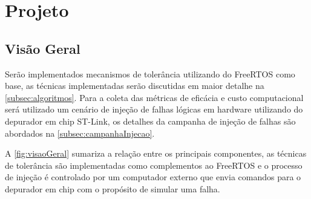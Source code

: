 

\chapter{Projeto}
\label{cap:proj}

\section{Visão Geral}

Serão implementados mecanismos de tolerância utilizando do FreeRTOS como base, as técnicas implementadas serão discutidas em maior detalhe na \autoref{subsec:algoritmos}. Para a coleta das métricas de eficácia e custo computacional será utilizado um cenário de injeção de falhas lógicas em hardware utilizando do depurador em chip ST-Link, os detalhes da campanha de injeção de falhas são abordados na \autoref{subsec:campanhaInjecao}.

A \autoref{fig:visaoGeral} sumariza a relação entre os principais componentes, as técnicas de tolerância são implementadas como complementos ao FreeRTOS e o processo de injeção é controlado por um computador externo que envia comandos para o depurador em chip com o propósito de simular uma falha.


